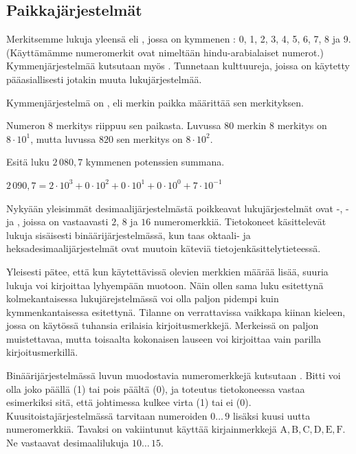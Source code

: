 \subsection*{Paikkajärjestelmät}

Merkitsemme lukuja yleensä  eli , jossa on kymmenen : 0, 1, 2, 3, 4, 5, 6, 7, 8 ja 9. (Käyttämämme numeromerkit ovat nimeltään hindu-arabialaiset numerot.) Kymmenjärjestelmää kutsutaan myös . Tunnetaan kulttuureja, joissa on käytetty pääasiallisesti jotakin muuta lukujärjestelmää.

Kymmenjärjestelmä on , eli merkin paikka määrittää sen merkityksen.
\begin{esimerkki}
Numeron 8 merkitys riippuu sen paikasta. Luvussa $80$ merkin 8 merkitys on $8 \cdot 10^1$, mutta luvussa $820$ sen merkitys on $8 \cdot 10^2$.
\end{esimerkki}
\begin{esimerkki}
Esitä luku $2\,080,7$ kymmenen potenssien summana.
	\begin{esimratk}
	$2\,090,7=2\cdot10^3+0\cdot10^2+0\cdot10^1+0\cdot10^0+7\cdot10^{-1}$
	\end{esimratk}
\end{esimerkki}

Nykyään yleisimmät desimaalijärjestelmästä poikkeavat lukujärjestelmät ovat -, - ja , joissa on vastaavasti $2$, $8$ ja $16$ numeromerkkiä. Tietokoneet käsittelevät lukuja sisäisesti binäärijärjestelmässä, kun taas oktaali- ja heksadesimaalijärjestelmät ovat muutoin käteviä tietojenkäsittelytieteessä.

Yleisesti pätee, että kun käytettävissä olevien merkkien määrää lisää, suuria lukuja voi kirjoittaa lyhyempään muotoon. Näin ollen sama luku esitettynä kolmekantaisessa lukujärejstelmässä voi olla paljon pidempi kuin kymmenkantaisessa esitettynä. Tilanne on verrattavissa vaikkapa kiinan kieleen, jossa on käytössä tuhansia erilaisia kirjoitusmerkkejä. Merkeissä on paljon muistettavaa, mutta toisaalta kokonaisen lauseen voi kirjoittaa vain parilla kirjoitusmerkillä.

Binäärijärjestelmässä luvun muodostavia numeromerkkejä kutsutaan . Bitti voi olla joko päällä (1) tai pois päältä (0), ja toteutus tietokoneessa vastaa esimerkiksi sitä, että johtimessa kulkee virta (1) tai ei (0). Kuusitoistajärjestelmässä tarvitaan numeroiden $0 \ldots \, 9$ lisäksi kuusi uutta numeromerkkiä. Tavaksi on vakiintunut käyttää kirjainmerkkejä $\mathrm{A, B, C, D, E, F}$. Ne vastaavat desimaalilukuja $10 \ldots \, 15$.

